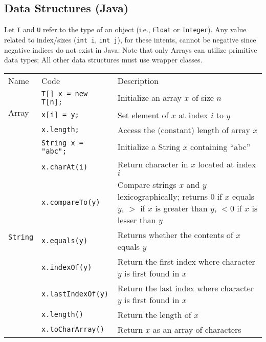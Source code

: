 \documentclass{article}
\begin{document}
\subsection{Data Structures (Java)}
Let \lstinline|T| and \lstinline|U| refer to the type of an object (i.e., \lstinline|Float| or \lstinline|Integer|). Any value related to index/sizes (\lstinline|int i|, \lstinline|int j|), for these intents, cannot be negative since negative indices do not exist in Java. Note that only Arrays can utilize primitive data types; All other data structures must use wrapper classes.
\setlength{\tabcolsep}{3pt}
\begin{center}\begin{tabularx}{\textwidth}{llX}\toprule
  Name & Code & Description\\
  \multirow{3}{*}{Array} & \lstinline|T[] x = new T[n];| & Initialize an array \(x\) of size \(n\)\\
                         & \lstinline|x[i] = y;| & Set element of \(x\) at index \(i\) to \(y\)\\
                         & \lstinline|x.length;| & Access the (constant) length of array \(x\) \\\midrule
  \multirow{12}{*}[-0.5em]{\lstinline|String|} & \lstinline|String x = "abc";| & Initialize a String \(x\) containing \enquote{abc}\\
                                         & \lstinline|x.charAt(i)| & Return character in \(x\) located at index \(i\)\\
                                         & \lstinline|x.compareTo(y)| & Compare strings \(x\) and \(y\) lexicographically; returns \(0\) if \(x\) equals \(y\), \(>\) if \(x\) is greater than \(y\), \(<0\) if \(x\) is lesser than \(y\)\\
                                         & \lstinline|x.equals(y)| & Returns whether the contents of \(x\) equals \(y\)\\
                                         & \lstinline|x.indexOf(y)| & Return the first index where character \(y\) is first found in \(x\)\\
                                         & \lstinline|x.lastIndexOf(y)| & Return the last index where character \(y\) is first found in \(x\)\\
                                         & \lstinline|x.length()| & Return the length of \(x\)\\
                                         & \lstinline|x.toCharArray()| & Return \(x\) as an array of characters\\

\end{tabularx}
\end{center}
\end{document}
